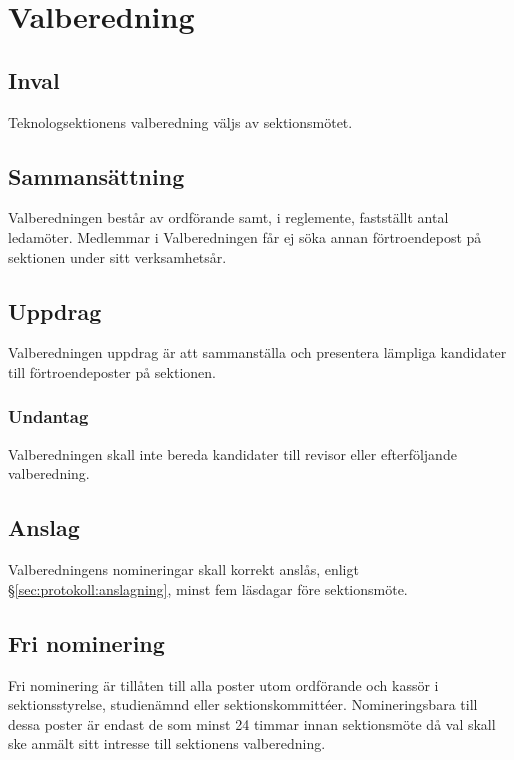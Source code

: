 \section{Valberedning}

\subsection{Inval}
Teknologsektionens valberedning väljs av sektionsmötet.

\subsection{Sammansättning}
Valberedningen består av ordförande samt, i reglemente, fastställt antal ledamöter. Medlemmar i Valberedningen får ej söka annan förtroendepost på sektionen under sitt verksamhetsår.

\subsection{Uppdrag}
Valberedningen uppdrag är att sammanställa och presentera lämpliga kandidater till förtroendeposter på sektionen.

\subsubsection{Undantag}
Valberedningen skall inte bereda kandidater till revisor eller efterföljande valberedning.

\subsection{Anslag}
Valberedningens nomineringar skall korrekt anslås, enligt §\ref{sec:protokoll:anslagning}, minst fem läsdagar före sektionsmöte.

\subsection{Fri nominering}
Fri nominering är tillåten till alla poster utom ordförande och kassör i sektionsstyrelse, studienämnd eller sektionskommittéer. Nomineringsbara till dessa poster är endast de som minst 24 timmar innan sektionsmöte då val skall ske anmält sitt intresse till sektionens valberedning.
